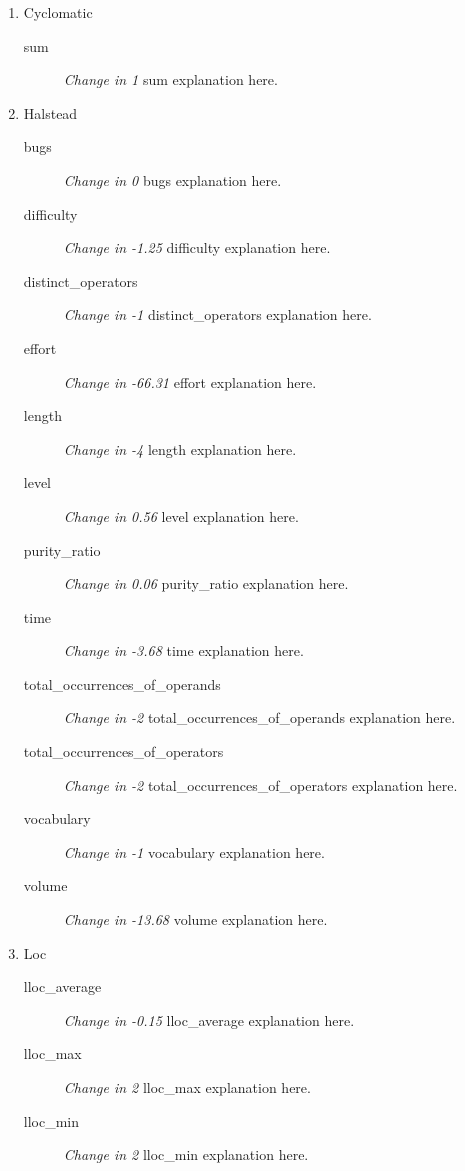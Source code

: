 \begin{enumerate}
      \item Cyclomatic
            \begin{description}
                  \item [sum] \textit{Change in 1} sum explanation here.
            \end{description}
      \item Halstead
            \begin{description}
                  \item [bugs] \textit{Change in 0} bugs explanation here.
                  \item [difficulty] \textit{Change in -1.25} difficulty explanation here.
                  \item [distinct\_operators] \textit{Change in -1} distinct\_operators explanation here.
                  \item [effort] \textit{Change in -66.31} effort explanation here.
                  \item [length] \textit{Change in -4} length explanation here.
                  \item [level] \textit{Change in 0.56} level explanation here.
                  \item [purity\_ratio] \textit{Change in 0.06} purity\_ratio explanation here.
                  \item [time] \textit{Change in -3.68} time explanation here.
                  \item [total\_occurrences\_of\_operands] \textit{Change in -2} total\_occurrences\_of\_operands explanation here.
                  \item [total\_occurrences\_of\_operators] \textit{Change in -2} total\_occurrences\_of\_operators explanation here.
                  \item [vocabulary] \textit{Change in -1} vocabulary explanation here.
                  \item [volume] \textit{Change in -13.68} volume explanation here.
            \end{description}
      \item Loc
            \begin{description}
                  \item [lloc\_average] \textit{Change in -0.15} lloc\_average explanation here.
                  \item [lloc\_max] \textit{Change in 2} lloc\_max explanation here.
                  \item [lloc\_min] \textit{Change in 2} lloc\_min explanation here.

\end{description}
\end{enumerate}

